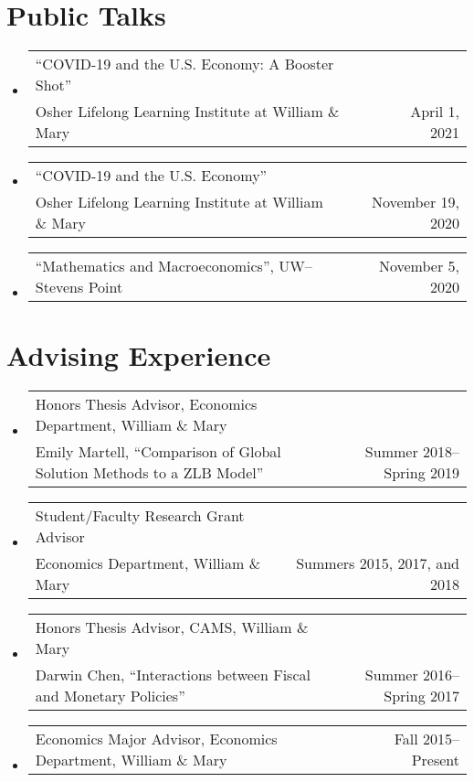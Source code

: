 \documentclass[10pt,letterpaper,en-US]{article}
\makeatletter
\newcommand{\itemrow}[2]
{\begin{tabular*}{\linewidth}{l@{\extracolsep{\fill}}r}
	#1 & #2 \\
\end{tabular*}}
\makeatother
\begin{document}
\section*{Public Talks}
\begin{itemize}
    \item \itemrow{``COVID-19 and the U.S. Economy: A Booster Shot'' \\ Osher Lifelong Learning Institute at William \& Mary}{April 1, 2021}
    \item \itemrow{``COVID-19 and the U.S. Economy'' \\ Osher Lifelong Learning Institute at William \& Mary}{November 19, 2020}
    \item \itemrow{``Mathematics and Macroeconomics'', UW--Stevens Point}{November 5, 2020}
\end{itemize}

\section*{Advising Experience}
\begin{itemize}
    \item \itemrow{Honors Thesis Advisor, Economics Department, William \& Mary  \\
    Emily Martell, ``Comparison of Global Solution Methods to a ZLB Model''}{Summer 2018--Spring 2019}
    \item \itemrow{Student/Faculty Research Grant Advisor \\
     Economics Department, William \& Mary}{Summers 2015, 2017, and 2018}
    \item \itemrow{Honors Thesis Advisor, CAMS, William \& Mary  \\
    Darwin Chen, ``Interactions between Fiscal and Monetary Policies''}{Summer 2016--Spring 2017}
    \item \itemrow{Economics Major Advisor, Economics Department, William \& Mary}{Fall 2015--Present}
\end{itemize}

\newpage
\end{document}
